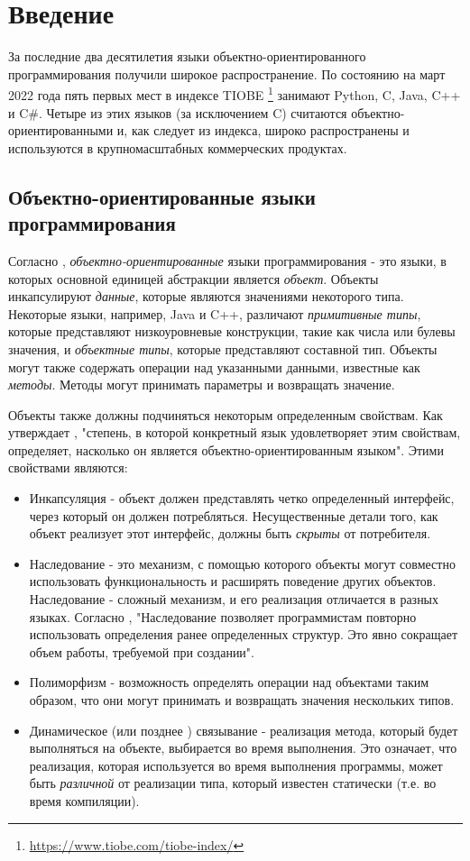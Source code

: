 \chapter{Введение}
За последние два десятилетия языки объектно-ориентированного программирования получили широкое распространение.
По состоянию на март 2022 года пять первых мест в индексе TIOBE \footnote{\url{https://www.tiobe.com/tiobe-index/}} занимают Python, C, Java, C++ и C\#.
Четыре из этих языков (за исключением C) считаются объектно-ориентированными и, как следует из индекса,
широко распространены и используются в крупномасштабных коммерческих продуктах.

\section{Объектно-ориентированные языки программирования}
Согласно \cite{oop1}, \textit{объектно-ориентированные} языки программирования - это языки, в которых основной единицей абстракции является \textit{объект}.
Объекты инкапсулируют \textit{данные}, которые являются значениями некоторого типа.
Некоторые языки, например, Java и C++, различают \textit{примитивные типы},
которые представляют низкоуровневые конструкции, такие как числа или булевы значения, и \textit{объектные типы},
которые представляют составной тип. Объекты могут также содержать операции над указанными данными,
известные как \textit{методы}. Методы могут принимать параметры и возвращать значение.

Объекты также должны подчиняться некоторым определенным свойствам. Как утверждает \cite{oop1}, "степень, в которой конкретный язык удовлетворяет этим свойствам, определяет, насколько он является объектно-ориентированным языком". Этими свойствами являются:
\begin{itemize}
      \item Инкапсуляция - объект должен представлять четко определенный интерфейс, через который он должен потребляться. Несущественные детали того, как объект реализует этот интерфейс, должны быть \textit{скрыты} от потребителя.
      \item Наследование - это механизм, с помощью которого объекты могут совместно использовать функциональность и расширять поведение других объектов. Наследование - сложный механизм, и его реализация отличается в разных языках. Согласно \cite{oop1}, "Наследование позволяет программистам повторно использовать определения ранее определенных структур. Это явно сокращает объем работы, требуемой при создании".
      \item Полиморфизм - возможность определять операции над объектами таким образом, что они могут принимать и возвращать значения нескольких типов.
      \item Динамическое (или позднее \cite{alankay}) связывание - реализация метода, который будет выполняться на объекте, выбирается во время выполнения. Это означает, что реализация, которая используется во время выполнения программы, может быть \textit{различной} от реализации типа, который известен статически (т.е. во время компиляции).
\end{itemize}


